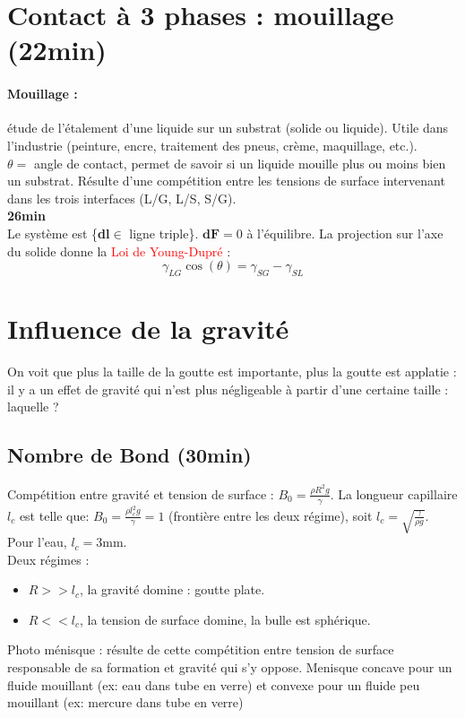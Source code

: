 \documentclass[11pt]{report}
\numberwithin{figure}{section}
\numberwithin{equation}{section}
\numberwithin{table}{section}
\newcommand{\1}{\boldsymbol{1}}
\begin{document}
  \section{Contact à 3 phases : mouillage (22min)}
  \paragraph*{Mouillage :} étude de l'étalement d'une liquide sur un substrat (solide ou liquide). Utile dans l'industrie (peinture, encre, traitement des pneus, crème, maquillage, etc.).\\
  $\theta =$ angle de contact, permet de savoir si un liquide mouille plus ou moins bien un substrat. Résulte d'une compétition entre les tensions de surface intervenant dans les trois interfaces (L/G, L/S, S/G). \\
  \textbf{26min}\\
  Le système est \{\textbf{dl}$\in$ ligne triple\}. 
  $\textbf{dF}=0$ à l'équilibre. La projection sur l'axe du solide donne la \textcolor{red}{Loi de Young-Dupré} :
  \begin{equation}
      \gamma_{LG}\cos(\theta) = \gamma_{SG}-\gamma_{SL}
  \end{equation}
  
  \section{Influence de la gravité}
  On voit que plus la taille de la goutte est importante, plus la goutte est applatie : il y a un effet de gravité qui n'est plus négligeable à partir d'une certaine taille : laquelle ?
  \subsection{Nombre de Bond (30min)}
  Compétition entre gravité et tension de surface : $B_0=\frac{\rho R^2g}{\gamma}$. La longueur capillaire $l_c$ est telle que: $B_0=\frac{\rho l_c^2g}{\gamma}=1$ (frontière entre les deux régime), soit $l_c = \sqrt{\frac{\gamma}{\rho g}}$.
  Pour l'eau, $l_c=3$mm.\\
  Deux régimes : 
  \begin{itemize}
      \item $R>>l_c$, la gravité domine : goutte plate.
      \item $R<<l_c$, la tension de surface domine, la bulle est sphérique.
  \end{itemize}
  Photo ménisque : résulte de cette compétition entre tension de surface responsable de sa formation et gravité qui s'y oppose. Menisque concave pour un fluide mouillant (ex: eau dans tube en verre) et convexe pour un fluide peu mouillant (ex: mercure dans tube en verre)
\end{document}
